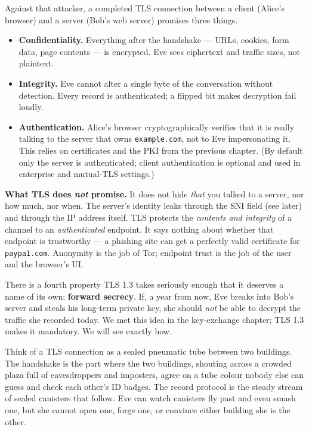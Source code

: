 Against that attacker, a completed TLS connection between a client (Alice's
browser) and a server (Bob's web server) promises three things.

\begin{itemize}
\item \textbf{Confidentiality.} Everything after the handshake --- URLs, cookies,
form data, page contents --- is encrypted. Eve sees ciphertext and traffic sizes,
not plaintext.
\item \textbf{Integrity.} Eve cannot alter a single byte of the conversation
without detection. Every record is authenticated; a flipped bit makes decryption
fail loudly.
\item \textbf{Authentication.} Alice's browser cryptographically verifies that it
is really talking to the server that owns \texttt{example.com}, not to Eve
impersonating it. This relies on certificates and the PKI from
the previous chapter. (By default only the server is authenticated; client
authentication is optional and used in enterprise and mutual-TLS settings.)
\end{itemize}

\begin{focusbox}
\textbf{What TLS does \emph{not} promise.} It does not hide \emph{that} you talked
to a server, nor how much, nor when. The server's identity leaks through the SNI
field (see later) and through the IP address itself. TLS protects the
\emph{contents and integrity} of a channel to an \emph{authenticated} endpoint. It
says nothing about whether that endpoint is trustworthy --- a phishing site can
get a perfectly valid certificate for \texttt{paypa1.com}. Anonymity is the job of
Tor; endpoint trust is the job of the user and the browser's UI.
\end{focusbox}

There is a fourth property TLS 1.3 takes seriously enough that it deserves a
name of its own: \textbf{forward secrecy}. If, a year from now, Eve breaks into
Bob's server and steals his long-term private key, she should \emph{not} be able
to decrypt the traffic she recorded today. We met this idea in the key-exchange
chapter; TLS 1.3 makes it mandatory. We will see exactly how.

\begin{intuitionbox}
Think of a TLS connection as a sealed pneumatic tube between two buildings. The
handshake is the part where the two buildings, shouting across a crowded plaza
full of eavesdroppers and imposters, agree on a tube colour nobody else can guess
and check each other's ID badges. The record protocol is the steady stream of
sealed canisters that follow. Eve can watch canisters fly past and even smash one,
but she cannot open one, forge one, or convince either building she is the other.
\end{intuitionbox}

